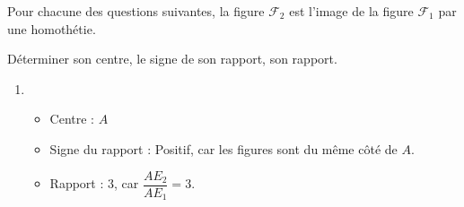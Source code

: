 \begin{corrige}
    Pour chacune des questions suivantes, la figure $\mathcal{F}_2$ est l'image de la figure $\mathcal{F}_1$ par une homothétie.
    
    Déterminer son centre, le signe de son rapport, son rapport.
    
    \begin{enumerate}
        \item {\color{red}    
        \begin{itemize}
            \item Centre : $A$
            \item Signe du rapport : Positif, car les figures sont du même côté de $A$.
            \item Rapport :  $3$, car $\dfrac{AE_2}{AE_1}=3$. 
        \end{itemize}
        }    
        

\end{enumerate}
\end{corrige}
